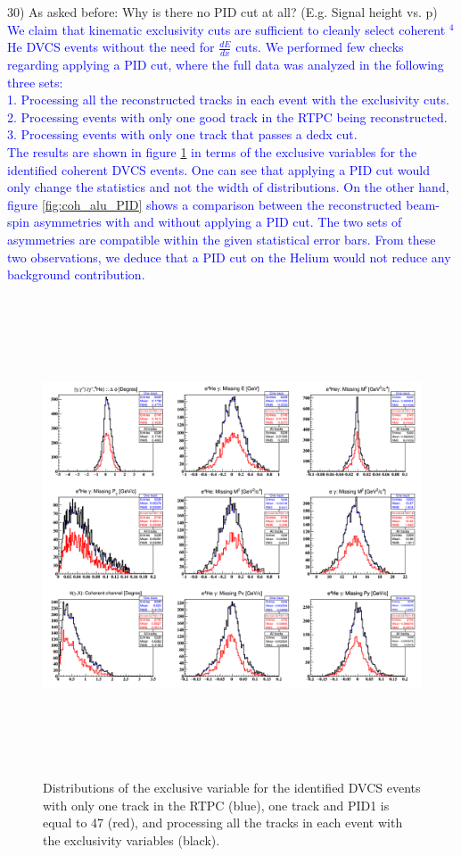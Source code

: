 30) As asked before: Why is there no PID cut at all? (E.g. Signal height vs.  
p)\\
\textcolor{blue}{We claim that kinematic exclusivity cuts are sufficient to
cleanly select coherent $^4$He DVCS events without the need for $\frac{dE}{dx}$ 
cuts. We performed few checks regarding applying a PID cut, where the full data 
was analyzed in the following three sets:\\
1. Processing all the reconstructed tracks in each event with the exclusivity 
cuts.\\
2. Processing events with only one good track in the RTPC being 
reconstructed.\\
3. Processing events with only one track that passes a dedx cut.\\
The results are shown in figure \ref{fig:all_incoh_exc_cuts} in terms of the 
exclusive variables for the identified coherent DVCS events. One can see that 
applying a PID cut would only change the statistics and not the width of 
distributions. On the other hand, figure 
\ref{fig:coh_alu_PID} shows a comparison between the reconstructed beam-spin 
asymmetries with and without applying a PID cut. The two sets 
of asymmetries are compatible within the given statistical error bars.
From these two observations, we deduce that a PID cut on the Helium would
not reduce any background contribution.}\\

\begin{figure}[tbp]
   \hspace{-0.5cm}
\includegraphics[height=14.2cm]{fig/all_incoh_exc_cuts.png}
\caption{Distributions of the exclusive variable for the identified DVCS events 
with only one track in the RTPC (blue), one track and PID1 is equal to 47 
(red), and processing all the tracks in each event with the exclusivity 
variables (black).}
\label{fig:all_incoh_exc_cuts}
\end{figure}

